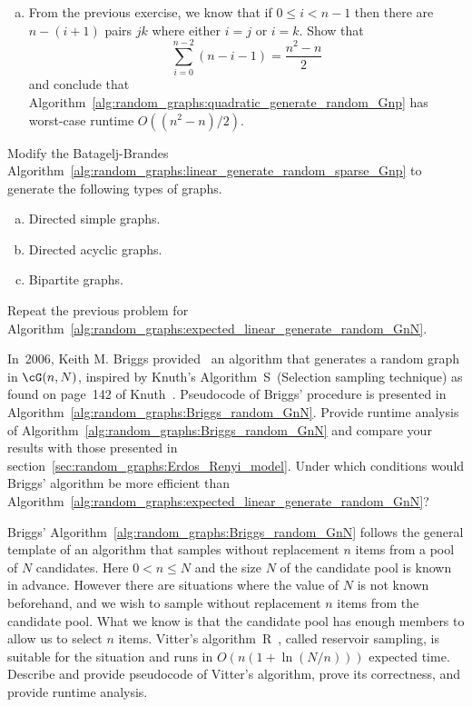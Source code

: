 \begin{problem}
\begin{enumerate}[(a)]
  \item From the previous exercise, we know that if $0 \leq i < n - 1$
    then there are $n - (i + 1)$ pairs $jk$ where either $i = j$ or
    $i = k$. Show that
    \[
    \sum_{i=0}^{n-2} (n - i - 1)
    =
    \frac{n^2 - n}{2}
    \]
    and conclude that
    Algorithm~\ref{alg:random_graphs:quadratic_generate_random_Gnp}
    has worst-case runtime $O((n^2 - n) / 2)$.
  \end{enumerate}

\item Modify the Batagelj-Brandes
  Algorithm~\ref{alg:random_graphs:linear_generate_random_sparse_Gnp}
  to generate the following types of graphs.
  \begin{enumerate}[(a)]
  \item Directed simple graphs.

  \item Directed acyclic graphs.

  \item Bipartite graphs.
  \end{enumerate}

\item Repeat the previous problem for
  Algorithm~\ref{alg:random_graphs:expected_linear_generate_random_GnN}.

\item In~2006, Keith M. Briggs
  provided~\cite{Briggs2011} an algorithm that generates a random
  graph in $\cG(n,N)$, inspired by Knuth's
  Algorithm~S~(Selection sampling technique) as found on page~142 of
  Knuth~\cite{Knuth1998b}. Pseudocode of
  Briggs' procedure is presented in
  Algorithm~\ref{alg:random_graphs:Briggs_random_GnN}. Provide runtime
  analysis of Algorithm~\ref{alg:random_graphs:Briggs_random_GnN} and
  compare your results with those presented in
  section~\ref{sec:random_graphs:Erdos_Renyi_model}. Under which
  conditions would Briggs' algorithm be more efficient than
  Algorithm~\ref{alg:random_graphs:expected_linear_generate_random_GnN}?

\item Briggs'
  Algorithm~\ref{alg:random_graphs:Briggs_random_GnN} follows the
  general template of an algorithm that samples without replacement
  $n$ items from a pool of $N$ candidates. Here $0 < n \leq N$ and the
  size $N$ of the candidate pool is known in advance. However there
  are situations where the value of $N$ is not known beforehand, and
  we wish to sample without replacement $n$ items from the candidate
  pool. What we know is that the candidate pool has enough members to
  allow us to select $n$ items. Vitter's
  algorithm~R~\cite{Vitter1985}, called
  reservoir sampling, is suitable for the
  situation and runs in $O(n (1 + \ln(N/n)))$ expected time. Describe
  and provide pseudocode of Vitter's algorithm,
  prove its correctness, and provide runtime analysis.


\end{problem}

